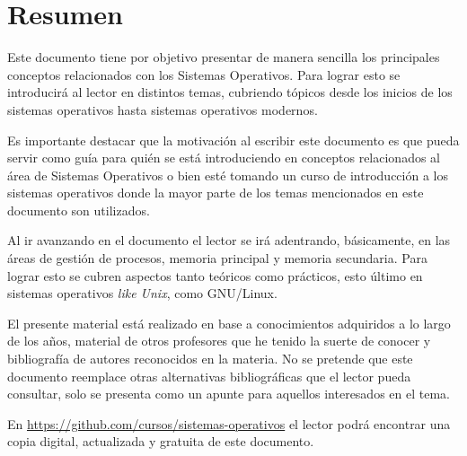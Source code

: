 %
%
%
% 

\chapter*{Resumen}
Este documento tiene por objetivo presentar de manera sencilla los principales
conceptos relacionados con los Sistemas Operativos. Para lograr esto se
introducirá al lector en distintos temas, cubriendo tópicos desde los inicios de
los sistemas operativos hasta sistemas operativos modernos.

Es importante destacar que la motivación al escribir este documento es que pueda
servir como guía para quién se está introduciendo en conceptos relacionados al
área de Sistemas Operativos o bien esté tomando un curso de introducción a los
sistemas operativos donde la mayor parte de los temas mencionados en este
documento son utilizados.

Al ir avanzando en el documento el lector se irá adentrando, básicamente, en las
áreas de gestión de procesos, memoria principal y memoria secundaria. Para
lograr esto se cubren aspectos tanto teóricos como prácticos, esto último en
sistemas operativos \textit{like Unix}, como GNU/Linux.

El presente material está realizado en base a conocimientos adquiridos a lo
largo de los años, material de otros profesores que he tenido la suerte de
conocer y bibliografía de autores reconocidos en la materia. No se pretende que
este documento reemplace otras alternativas bibliográficas que el lector pueda
consultar, solo se presenta como un apunte para aquellos interesados en el
tema.

En \url{https://github.com/cursos/sistemas-operativos} el lector podrá encontrar
una copia digital, actualizada y gratuita de este documento.

\newpage
\mbox{}
\thispagestyle{empty}
